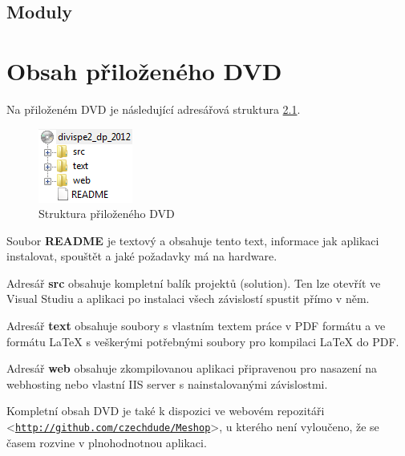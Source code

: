 \documentclass[11pt,twoside,a4paper]{book}
\let\oldUrl\url
\renewcommand\url[1]{<\texttt{\oldUrl{#1}}>}
\begin{document}
\section{Moduly}

\chapter{Obsah přiloženého DVD}

Na přiloženém DVD je následující adresářová struktura \ref{fig:seznamcd}.

\begin{figure}[h]
\begin{center}
\includegraphics[scale=1]{figures/cd}
\caption{Struktura přiloženého DVD}
\label{fig:seznamcd}
\end{center}
\end{figure}

Soubor \textbf{README} je textový a obsahuje tento text, informace jak aplikaci instalovat, spouštět a jaké požadavky má na hardware.

Adresář \textbf{src} obsahuje kompletní balík projektů (solution). Ten lze otevřít ve Visual Studiu a aplikaci po instalaci všech závislostí spustit přímo v něm.

Adresář \textbf{text} obsahuje soubory s vlastním textem práce v PDF formátu a ve formátu {\LaTeX} s veškerými potřebnými soubory pro kompilaci {\LaTeX} do PDF.

Adresář \textbf{web} obsahuje zkompilovanou aplikaci připravenou pro nasazení na webhosting nebo vlastní IIS server s nainstalovanými závislostmi.

Kompletní obsah DVD je také k dispozici ve webovém repozitáři \url{http://github.com/czechdude/Meshop}, u kterého není vyloučeno, že se časem rozvine v plnohodnotnou aplikaci.
\end{document}
